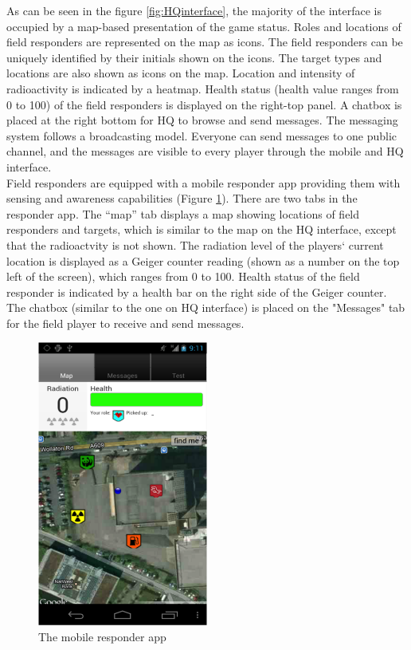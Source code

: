 As can be seen in the figure \ref{fig:HQinterface}, the majority of the interface is occupied by a map-based presentation of the game status. Roles and locations of field responders are represented on the map as icons. The field responders can be uniquely identified by their initials shown on the icons. The target types and locations are also shown as icons on the map. Location and intensity of radioactivity is indicated by a heatmap. Health status (health value ranges from 0 to 100) of the field responders is displayed on the right-top panel. A chatbox is placed at the right bottom for HQ to browse and send messages. The messaging system follows a broadcasting model. Everyone can send messages to one public channel, and the messages are visible to every player through the mobile and HQ interface.\\

Field responders are equipped with a mobile responder app providing them with sensing and awareness capabilities (Figure \ref{fig:mobileResponderApp}). There are two tabs in the responder app. The ``map'' tab displays a map showing locations of field responders and targets, which is similar to the map on the HQ interface, except that the radioactvity is not shown. The radiation level of the players` current location is displayed as a Geiger counter reading (shown as a number on the top left of the screen), which ranges from 0 to 100. Health status of the field responder is indicated by a health bar on the right side of the Geiger counter. The chatbox (similar to the one on HQ interface) is placed on the "Messages" tab for the field player to receive and send messages.\\

\begin{figure}[h]
  \centering
  \includegraphics[width=0.5\textwidth]{img/study1/mobileinterface}
  \caption{The mobile responder app}
  \label{fig:mobileResponderApp}
\end{figure}

